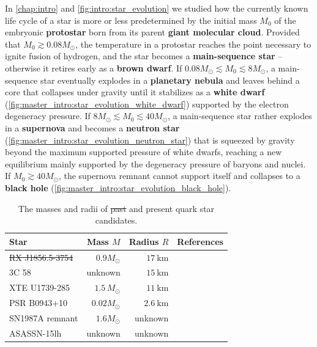 In \cref{chap:intro} and \cref{fig:intro:star_evolution} we studied how the currently known life cycle of a star
is more or less predetermined by the initial mass $M_0$ of the embryonic \textbf{protostar} born from its parent \textbf{giant molecular cloud}.
Provided that $M_0 \gtrsim 0.08 M_\odot$, the temperature in a protostar reaches the point necessary to ignite fusion of hydrogen, and the star becomes a \textbf{main-sequence star} -- otherwise it retires early as a \textbf{brown dwarf}.
If $0.08 M_\odot \lesssim M_0 \lesssim 8 M_\odot$, a main-sequence star eventually explodes in a \textbf{planetary nebula} and leaves behind a core that collapses under gravity until it stabilizes as a \textbf{white dwarf} (\cref{fig:master_intro:star_evolution_white_dwarf}) supported by the electron degeneracy pressure.
If $8 M_\odot \lesssim M_0 \lesssim 40 M_\odot$, a main-sequence star rather explodes in a \textbf{supernova} and becomes a \textbf{neutron star} (\cref{fig:master_intro:star_evolution_neutron_star}) that is squeezed by gravity beyond the maximum supported pressure of white dwarfs, reaching a new equilibrium mainly supported by the degeneracy pressure of baryons and nuclei.
If $M_0 \gtrsim 40 M_\odot$, the supernova remnant cannot support itself and collapses to a \textbf{black hole} (\cref{fig:master_intro:star_evolution_black_hole}).

\begin{table}
\centering
\begin{tabular}{ l r r l }
	\toprule
	Star & Mass $M$ & Radius $R$ & References \\
	\midrule
	\st{RX J1856.5-3754} & \st{$0.9 M_\odot$} & \st{$\SI{17}{\kilo\meter}$} & \cite{ref:RXJ1856} \\
	3C 58 & unknown & $\SI{15}{\kilo\meter}$ & \cite{ref:3c58} \\
	XTE U1739-285 & $1.5 \, M_\odot$ & $\SI{11}{\kilo\meter}$ & \cite{ref:XTEJ1739} \\
	PSR B0943+10 & $0.02 M_\odot$ & $\SI{2.6}{\kilo\meter}$ & \cite{ref:PSRB0943} \\
	SN1987A remnant & $1.6 M_\odot$ & unknown & \cite{ref:SN1987A_1,ref:SN1987A_2} \\
	ASASSN-15lh & unknown & unknown & \cite{ref:ASASSN} \\
	\bottomrule
\end{tabular}
\caption{\label{tab:master_intro:quark_star_candidates}%
The masses and radii of \st{past} and present quark star candidates.
}
\end{table}

